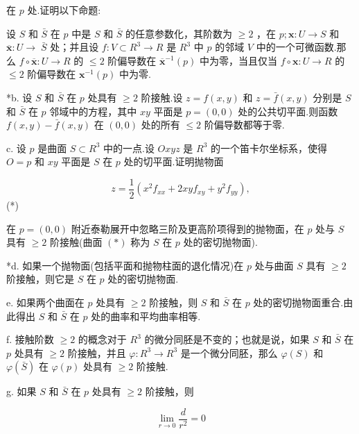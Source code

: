 在 \(p\) 处.证明以下命题:

设 \(S\) 和 \(\bar{S}\) 在 \(p\) 中是 \(S\) 和 \(\bar{S}\) 的任意参数化，其阶数为 \(\geq  2\) ，在 \(p;\mathbf{x} : U \rightarrow  S\) 和 \(\overline{\mathbf{x}} : U \rightarrow \; \bar{S}\) 处；并且设 \(f : V \subset  {R}^{3} \rightarrow  R\) 是 \({R}^{3}\) 中 \(p\) 的邻域 \(V\) 中的一个可微函数.那么 \(f \circ  \overline{\mathbf{x}} : U \rightarrow  R\) 的 \(\leq  2\) 阶偏导数在 \({\overline{\mathbf{x}}}^{-1}\left( p\right)\) 中为零，当且仅当 \(f \circ  \mathbf{x} : U \rightarrow  R\) 的 \(\leq  2\) 阶偏导数在 \({\mathbf{x}}^{-1}\left( p\right)\) 中为零.

*b. 设 \(S\) 和 \(\bar{S}\) 在 \(p\) 处具有 \(\geq  2\) 阶接触.设 \(z = f\left( {x,y}\right)\) 和 \(z = \bar{f}\left( {x,y}\right)\) 分别是 \(S\) 和 \(\bar{S}\) 在 \(p\) 邻域中的方程，其中 \({xy}\) 平面是 \(p = \left( {0,0}\right)\) 处的公共切平面.则函数 \(f\left( {x,y}\right)  - \bar{f}\left( {x,y}\right)\) 在 \(\left( {0,0}\right)\) 处的所有 \(\leq  2\) 阶偏导数都等于零.

c. 设 \(p\) 是曲面 \(S \subset  {R}^{3}\) 中的一点.设 \({Oxyz}\) 是 \({R}^{3}\) 的一个笛卡尔坐标系，使得 \(O = p\) 和 \({xy}\) 平面是 \(S\) 在 \(p\) 处的切平面.证明抛物面

\[
z = \frac{1}{2}\left( {{x}^{2}{f}_{xx} + {2xy}{f}_{xy} + {y}^{2}{f}_{yy}}\right) ,
\]
 (*)

在 \(p = \left( {0,0}\right)\) 附近泰勒展开中忽略三阶及更高阶项得到的抛物面，在 \(p\) 处与 \(S\) 具有 \(\geq  2\) 阶接触(曲面 \(\left( *\right)\) 称为 \(S\) 在 \(p\) 处的密切抛物面).

*d. 如果一个抛物面(包括平面和抛物柱面的退化情况)在 \(p\) 处与曲面 \(S\) 具有 \(\geq  2\) 阶接触，则它是 \(S\) 在 \(p\) 处的密切抛物面.

e. 如果两个曲面在 \(p\) 处具有 \(\geq  2\) 阶接触，则 \(S\) 和 \(\bar{S}\) 在 \(p\) 处的密切抛物面重合.由此得出 \(S\) 和 \(\bar{S}\) 在 \(p\) 处的曲率和平均曲率相等.

f. 接触阶数 \(\geq  2\) 的概念对于 \({R}^{3}\) 的微分同胚是不变的；也就是说，如果 \(S\) 和 \(\bar{S}\) 在 \(p\) 处具有 \(\geq  2\) 阶接触，并且 \(\varphi  : {R}^{3} \rightarrow  {R}^{3}\) 是一个微分同胚，那么 \(\varphi \left( S\right)\) 和 \(\varphi \left( \bar{S}\right)\) 在 \(\varphi \left( p\right)\) 处具有 \(\geq  2\) 阶接触.

g. 如果 \(S\) 和 \(\bar{S}\) 在 \(p\) 处具有 \(\geq  2\) 阶接触，则

\[
\mathop{\lim }\limits_{{r \rightarrow  0}}\frac{d}{{r}^{2}} = 0
\]

